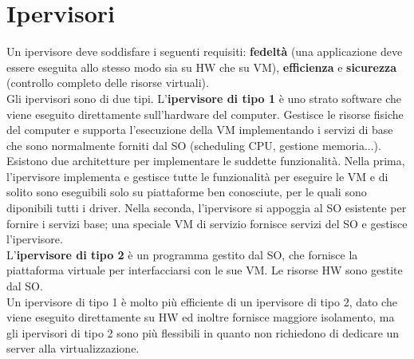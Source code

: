 \documentclass[12pt]{article}
\begin{document}
\section{Ipervisori}
Un ipervisore deve soddisfare i seguenti requisiti: \textbf{fedeltà} (una applicazione deve essere eseguita allo stesso
modo sia su HW che su VM), \textbf{efficienza} e \textbf{sicurezza} (controllo completo delle risorse virtuali).\\
Gli ipervisori sono di due tipi. L'\textbf{ipervisore di tipo 1} è uno strato software che viene eseguito direttamente
sull'hardware del computer. Gestisce le risorse fisiche del computer e supporta l'esecuzione della VM implementando i 
servizi di base che sono normalmente forniti dal SO (scheduling CPU, gestione memoria...). Esistono due architetture
per implementare le suddette funzionalità. Nella prima, l'ipervisore implementa e gestisce tutte le funzionalità per
eseguire le VM e di solito sono eseguibili solo su piattaforme ben conosciute, per le quali sono diponibili tutti i driver.
Nella seconda, l'ipervisore si appoggia al SO esistente per fornire i servizi base; una speciale VM di servizio fornisce
servizi del SO e gestisce l'ipervisore.\\
L'\textbf{ipervisore di tipo 2} è un programma gestito dal SO, che fornisce la piattaforma virtuale per interfacciarsi
con le sue VM. Le risorse HW sono gestite dal SO.\\
Un ipervisore di tipo 1 è molto più efficiente di un ipervisore di tipo 2, dato che viene eseguito direttamente su HW
ed inoltre fornisce maggiore isolamento, ma gli ipervisori di tipo 2 sono più flessibili in quanto non richiedono di
dedicare un server alla virtualizzazione.
\end{document}
